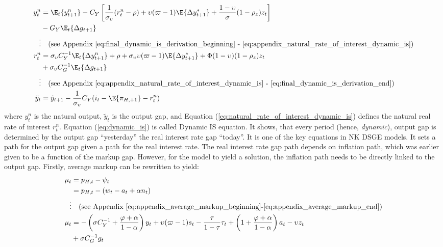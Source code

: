 \begin{align}
    y^n_t  &= \E_t \{y^n_{t+1}\} - C_Y\left[\frac{1}{\sigma_\upsilon}(r^n_t - \rho) + \upsilon (\varpi - 1)\E \{\Delta y_{t+1}^* \}  + \frac{1-\upsilon}{\sigma} (1-\rho_z)z_t\right] \nonumber \\
    &- G_Y \E_t \{ \Delta g_{t+1} \}\\
    \vdots & \quad \text{(see Appendix \ref{eq:final_dynamic_is_derivation_beginning} - \ref{eq:appendix_natural_rate_of_interest_dynamic_is})} \nonumber \\
    r^n_t  &= \sigma_\upsilon C_Y^{-1} \E_t \{\Delta y^n_{t+1}\} + \rho + \sigma_\upsilon \upsilon (\varpi - 1)\E \{\Delta y_{t+1}^* \}  + \Phi (1-\upsilon)(1-\rho_z)z_t \nonumber \\ 
    &+ \sigma_\upsilon C_G^{-1}\E_t \{ \Delta g_{t+1} \} \label{eq:natural_rate_of_interest_dynamic_is}\\
    \vdots & \quad \text{(see Appendix \ref{eq:appendix_natural_rate_of_interest_dynamic_is} - \ref{eq:final_dynamic_is_derivation_end})} \nonumber \\
    \tilde{y}_t &= \tilde{y}_{t+1} - \frac{1}{\sigma_\upsilon}C_Y(i_t - \E \{ \pi_{H,+1}\} - r^n_t) \label{eq:dynamic_is}
\end{align}
where $y^n_{t}$ is the natural output, $\tilde{y}_t$ is the output gap, and Equation (\ref{eq:natural_rate_of_interest_dynamic_is}) defines the natural real rate of interest $r_t^n$. Equation (\ref{eq:dynamic_is}) is called Dynamic IS equation. It shows, that every period (hence, \textit{dynamic}), output gap is determined by the output gap ``yesterday'' the real interest rate gap ``today''. It is one of the key equations in NK DSGE models. It sets a path for the output gap given a path for the real interest rate. The real interest rate gap path depends on inflation path, which was earlier given to be a function of the markup gap. However, for the model to yield a solution, the inflation path needs to be directly linked to the output gap. Firstly, average markup can be rewritten to yield:
\begin{align}
    \mu_t &= p_{H,t} - \psi_t \\
     &= p_{H,t} - (w_t - a_t + \alpha n_t) \nonumber \\
    \vdots & \quad \text{(see Appendix \ref{eq:appendix_average_markup_beginning}-\ref{eq:appendix_average_markup_end})} \nonumber \\
    \mu_t &= -\left(\sigma C_Y^{-1} + \frac{\varphi + \alpha}{1-\alpha}\right)y_t + \upsilon (\varpi - 1) s_t - \frac{\tau}{1-\tau}\tau_t  + \left(1 + \frac{\varphi + \alpha}{1-\alpha}\right)a_t - \upsilon z_t \nonumber \\ 
    &+ \sigma C_G^{-1} g_t  \label{eq:average_markup}
\end{align}
